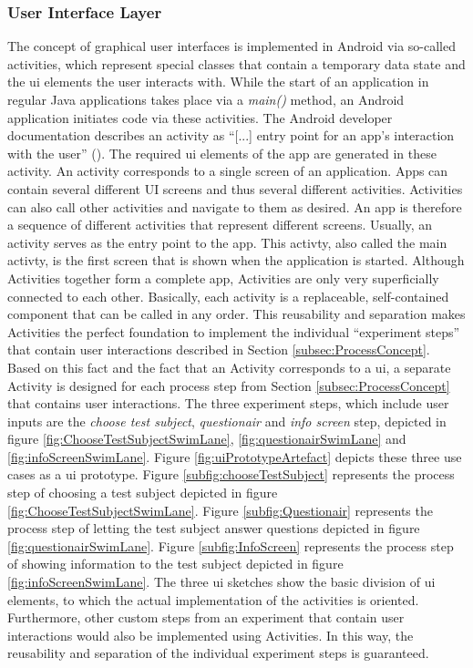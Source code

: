 \subsubsection{User Interface Layer}

The concept of graphical user interfaces is implemented in Android via so-called activities, which represent special classes that contain a temporary data state and the \ac{ui} elements the user interacts with. While the start of an application in regular Java applications takes place via a \textit{main()} method, an Android application initiates code via these activities. The Android developer documentation describes an activity as \enquote{[...] entry point for an app's interaction with the user} (\cite{Google.2023}). The required \ac{ui} elements of the app are generated in these activity. An activity corresponds to a single screen of an application. Apps can contain several different UI screens and thus several different activities. Activities can also call other activities and navigate to them as desired. An app is therefore a sequence of different activities that represent different screens. Usually, an activity serves as the entry point to the app. This activty, also called the main activty, is the first screen that is shown when the application is started. Although Activities together form a complete app, Activities are only very superficially connected to each other. Basically, each activity is a replaceable, self-contained component that can be called in any order. This reusability and separation makes Activities the perfect foundation to implement the individual \enquote{experiment steps} that contain user interactions described in Section \ref{subsec:ProcessConcept}. Based on this fact and the fact that an Activity corresponds to a \ac{ui}, a separate Activity is designed for each process step from Section \ref{subsec:ProcessConcept} that contains user interactions. The three experiment steps, which include user inputs are the \textit{choose test subject}, \textit{questionair} and \textit{info screen} step, depicted in figure \ref{fig:ChooseTestSubjectSwimLane}, \ref{fig:questionairSwimLane} and \ref{fig:infoScreenSwimLane}. Figure \ref{fig:uiPrototypeArtefact} depicts these three use cases as a \ac{ui} prototype. Figure \ref{subfig:chooseTestSubject} represents the process step of choosing a test subject depicted in figure \ref{fig:ChooseTestSubjectSwimLane}. Figure \ref{subfig:Questionair} represents the process step of letting the test subject answer questions depicted in figure \ref{fig:questionairSwimLane}. Figure \ref{subfig:InfoScreen}  represents the process step of showing information to the test subject depicted in figure \ref{fig:infoScreenSwimLane}. The three \ac{ui} sketches show the basic division of \ac{ui} elements, to which the actual implementation of the activities is oriented. Furthermore, other custom steps from an experiment that contain user interactions would also be implemented using Activities. In this way, the reusability and separation of the individual experiment steps is guaranteed.


